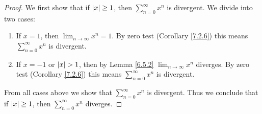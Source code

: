 \begin{proof}
    We first show that if \(\abs*{x} \geq 1\), then \(\sum_{n = 0}^\infty x^n\) is divergent.
    We divide into two cases:
    \begin{enumerate}
        \item If \(x = 1\), then \(\lim_{n \to \infty} x^n = 1\). By zero test (Corollary \ref{7.2.6}) this means \(\sum_{n = 0}^\infty x^n\) is divergent.
        \item If \(x = -1\) or \(\abs*{x} > 1\), then by Lemma \ref{6.5.2} \(\lim_{n \to \infty} x^n\) diverges.
              By zero test (Corollary \ref{7.2.6}) this means \(\sum_{n = 0}^\infty x^n\) is divergent.
    \end{enumerate}
    From all cases above we show that \(\sum_{n = 0}^\infty x^n\) is divergent.
    Thus we conclude that if \(\abs*{x} \geq 1\), then \(\sum_{n = 0}^\infty x^n\) diverges.


\end{proof}
